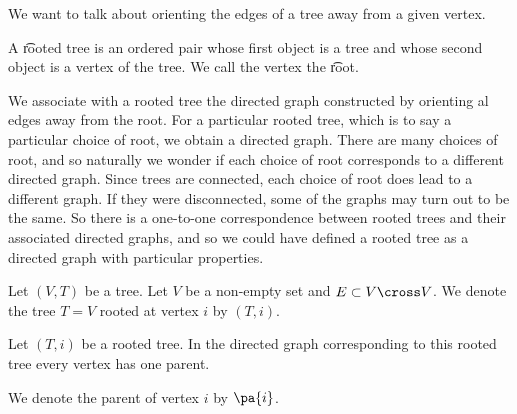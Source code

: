 

We want to talk about orienting the edges of a tree away from a given vertex.


A \t{rooted tree} is an ordered pair whose first object is a tree and whose second object is a vertex of the tree. We call the vertex the \t{root}.

We associate with a rooted tree the directed graph constructed by orienting al edges away from the root.
For a particular rooted tree, which is to say a particular choice of root, we obtain a directed graph.
There are many choices of root, and so naturally we wonder if each choice of root corresponds to a different directed graph.
Since trees are connected, each choice of root does lead to a different graph.
If they were disconnected, some of the graphs may turn out to be the same.
So there is a one-to-one correspondence between rooted trees and their associated directed graphs, and so we could have defined a rooted tree as a directed graph with particular properties.


Let $(V, T)$ be a tree.
Let $V$ be a non-empty set and $E \subset V \cross V$.
We denote the tree $T = V$ rooted at vertex $i$ by $(T, i)$.


\begin{prop}
Let $(T, i)$ be a rooted tree.
In the directed graph corresponding to this rooted tree every vertex has one parent.
\end{prop}

We denote the parent of vertex $i$ by $\pa{i}$.
